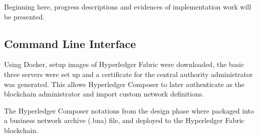 Beginning here, progress descriptions and evidences of implementation work will be presented.

\subsection{Command Line Interface}
Using Docker, setup images of Hyperledger Fabric were downloaded, the basic three servers were set up 
and a certificate for the central authority administrator was generated. This allows Hyperledger Composer 
to later authenticate as the blockchain administrator and import custom network definitions.

The Hyperledger Composer notations from the design phase where packaged into 
a business network archive (.bna) file, and deployed to the Hyperledger Fabric blockchain.


